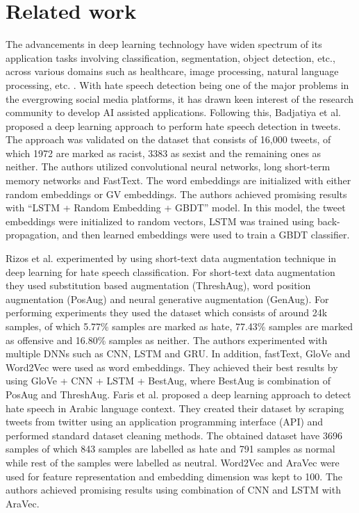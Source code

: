 \documentclass[runningheads]{llncs}
\begin{document}
\section{Related work}
The advancements in deep learning technology have widen spectrum of its application tasks involving classification, segmentation, object detection, etc., across various domains such as healthcare, image processing, natural language processing, etc. \cite{punn2021automated, punn2020inception, batra2021bert, punn2020multi, zhang2019empirical}. With hate speech detection being one of the major problems in the evergrowing social media platforms, it has drawn keen interest of the research community to develop AI assisted applications. Following this, Badjatiya et al. \cite{badjatiya2017deep} proposed a deep learning approach to perform hate speech detection in tweets. The approach was validated on the dataset \cite{waseem2016hateful} that consists of 16,000 tweets, of which 1972 are marked as racist, 3383 as sexist and the remaining ones as neither. The authors utilized convolutional neural networks, long short-term memory networks and FastText. The word embeddings are initialized with either random embeddings or GV \cite{pennington2014glove} embeddings. The authors achieved promising results with “LSTM + Random Embedding + GBDT” model. In this model, the tweet embeddings were initialized to random vectors, LSTM was trained using back-propagation, and then learned embeddings were used to train a GBDT classifier.
 
Rizos et al. \cite{rizos2019augment} experimented by using short-text data augmentation technique in deep learning for hate speech classification. For short-text data augmentation they used  substitution based augmentation (ThreshAug), word position augmentation (PosAug) and neural generative augmentation (GenAug). For performing experiments they used the dataset \cite{davidson2017automated} which consists of around 24k samples, of which 5.77\% samples are marked as hate, 77.43\% samples are marked as offensive and 16.80\% samples as neither. The authors experimented with multiple DNNs such as CNN, LSTM and GRU. In addition, fastText, GloVe and Word2Vec were used as word embeddings. They achieved their best results by using GloVe + CNN + LSTM + BestAug, where BestAug is combination of PosAug and ThreshAug. Faris et al. \cite{faris2020hate} proposed a deep learning approach to detect hate speech in Arabic language context. They created their dataset by scraping tweets from twitter using an application programming interface (API) \cite{api_wikipedia_2021} and performed standard dataset cleaning methods. The obtained dataset have 3696 samples of which 843 samples are labelled as hate and 791 samples as normal while rest of the samples were labelled as neutral. Word2Vec and AraVec \cite{soliman2017aravec} were used for feature representation and embedding dimension was kept to 100. The authors achieved promising results using combination of CNN and LSTM with AraVec.
\end{document}
